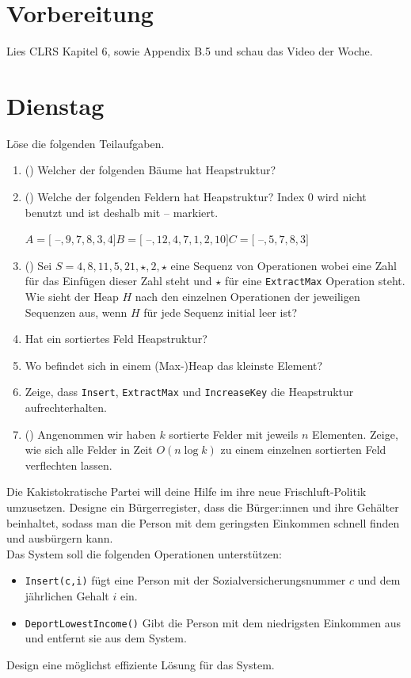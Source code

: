 \documentclass{uebung_cs}
\begin{document}
\section*{Vorbereitung}
Lies CLRS Kapitel 6, sowie Appendix B.5 und schau das Video der Woche.

\section*{Dienstag}
\begin{aufgabe}\label{tue-first}
	Löse die folgenden Teilaufgaben.
	\begin{enumerate}
		\item (\warmup) Welcher der folgenden Bäume hat Heapstruktur?
		\item (\warmup) Welche der folgenden Feldern hat Heapstruktur? Index 0 wird nicht benutzt und ist deshalb mit -- markiert.
		\begin{center}
			$A = [$ --$,9,7,8,3,4]$\hspace*{10pt}$B = [$ --$,12,4,7,1,2,10]$\hspace*{10pt}$C = [$ --$,5,7,8,3]$
		\end{center}
		\item (\warmup) Sei $S = 4,8,11,5,21,\star,2,\star$ eine Sequenz von Operationen wobei eine Zahl für das Einfügen dieser Zahl steht und $\star$ für eine \texttt{ExtractMax} Operation steht.
		Wie sieht der Heap $H$ nach den einzelnen Operationen der jeweiligen Sequenzen aus, wenn $H$ für jede Sequenz initial leer ist?
		\item Hat ein sortiertes Feld Heapstruktur?
		\item Wo befindet sich in einem (Max-)Heap das kleinste Element?
		\item Zeige, dass \texttt{Insert}, \texttt{ExtractMax} und \texttt{IncreaseKey} die Heapstruktur aufrechterhalten.
		\item (\hard) Angenommen wir haben $k$ sortierte Felder mit jeweils $n$ Elementen.
		Zeige, wie sich alle Felder in Zeit $O(n\log k)$ zu einem einzelnen sortierten Feld verflechten lassen.
	\end{enumerate}
\end{aufgabe}

\begin{aufgabe}
	Die Kakistokratische Partei will deine Hilfe im ihre neue \glqq Frischluft\grqq{}-Politik umzusetzen.
	Designe ein Bürgerregister, dass die Bürger:innen und ihre Gehälter beinhaltet, sodass man die Person mit dem geringsten Einkommen schnell finden und ausbürgern kann.\\
	Das System soll die folgenden Operationen unterstützen:
	\begin{itemize}
		\item \texttt{Insert(c,i)} fügt eine Person mit der Sozialversicherungsnummer $c$ und dem jährlichen Gehalt $i$ ein.
		\item \texttt{DeportLowestIncome()} Gibt die Person mit dem niedrigsten Einkommen aus und entfernt sie aus dem System.
	\end{itemize}
	Design eine möglichst effiziente Lösung für das System.
\end{aufgabe}
\end{document}
